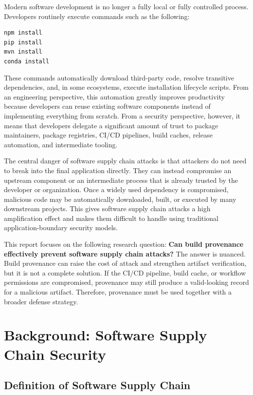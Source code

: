 \documentclass[12pt,a4paper]{article}
\begin{document}
Modern software development is no longer a fully local or fully controlled process. Developers routinely execute commands such as the following:

\begin{lstlisting}[style=commandstyle]
npm install
pip install
mvn install
conda install
\end{lstlisting}

These commands automatically download third-party code, resolve transitive dependencies, and, in some ecosystems, execute installation lifecycle scripts. From an engineering perspective, this automation greatly improves productivity because developers can reuse existing software components instead of implementing everything from scratch. From a security perspective, however, it means that developers delegate a significant amount of trust to package maintainers, package registries, CI/CD pipelines, build caches, release automation, and intermediate tooling.

The central danger of software supply chain attacks is that attackers do not need to break into the final application directly. They can instead compromise an upstream component or an intermediate process that is already trusted by the developer or organization. Once a widely used dependency is compromised, malicious code may be automatically downloaded, built, or executed by many downstream projects. This gives software supply chain attacks a high amplification effect and makes them difficult to handle using traditional application-boundary security models.

This report focuses on the following research question: \textbf{Can build provenance effectively prevent software supply chain attacks?} The answer is nuanced. Build provenance can raise the cost of attack and strengthen artifact verification, but it is not a complete solution. If the CI/CD pipeline, build cache, or workflow permissions are compromised, provenance may still produce a valid-looking record for a malicious artifact. Therefore, provenance must be used together with a broader defense strategy.

\section{Background: Software Supply Chain Security}

\subsection{Definition of Software Supply Chain}
\end{document}
